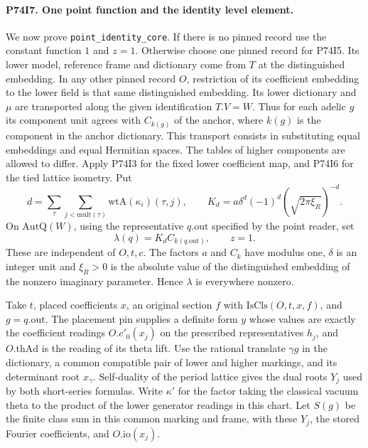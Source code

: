 \paragraph{P74I7. One point function and the identity level element.}
We now prove \texttt{point\_identity\_core}. If there is no pinned
record use the constant function $1$ and $z=1$. Otherwise choose
one pinned record for P74I5. Its lower model, reference frame and
dictionary come from $T$ at the distinguished embedding. In any
other pinned record $O$, restriction of its coefficient embedding to
the lower field is that same distinguished embedding. Its lower
dictionary and $\mu$ are transported along the given identification
$T.V=W$. Thus for each adelic $g$ its component unit agrees with
$C_{k(g)}$ of the anchor, where $k(g)$ is the component in the
anchor dictionary. This transport consists in substituting equal
embeddings and equal Hermitian spaces. The tables of higher
components are allowed to differ. Apply P74I3 for the fixed lower
coefficient map, and P74I6 for the tied lattice isometry. Put
\[
 d=\sum_{\tau}\sum_{j<\mathrm{mult}(\tau)}\mathrm{wtA}(\kappa_i)(\tau,j),
 \qquad K_d=a\delta^d(-1)^d(\sqrt{2\pi\xi_R})^{-d}.
\]
On $\mathrm{AutQ}(W)$, using the representative $q.\mathrm{out}$
specified by the point reader, set
\[
           \lambda(q)=K_d C_{k(q.\mathrm{out})},\qquad z=1.
\]
These are independent of $O,t,c$. The factors $a$ and $C_k$ have
modulus one, $\delta$ is an integer unit and $\xi_R>0$ is the
absolute value of the distinguished embedding of the nonzero
imaginary parameter. Hence $\lambda$ is everywhere nonzero.

Take $t$, placed coefficients $x$, an original section $f$ with
$\mathrm{IsCls}(O,t,x,f)$, and $g=q.\mathrm{out}$. The placement
pin supplies a definite form $y$ whose values are exactly the
coefficient readings $O.c'_0(x_j)$ on the prescribed representatives
$h_j$, and $O.\mathrm{thAd}$ is the reading of its theta lift.
Use the rational translate $\gamma g$ in the dictionary, a common
compatible pair of lower and higher markings, and its determinant
root $x_\gamma$. Self-duality of the period lattice gives the
dual roots $Y_j$ used by both short-series formulas. Write
$\kappa'$ for the factor taking the classical vacuum theta to the
product of the lower generator readings in this chart. Let $S(g)$
be the finite class sum in this common marking and frame, with
these $Y_j$, the stored Fourier coefficients, and $O.\mathrm{io}(x_j)$.

